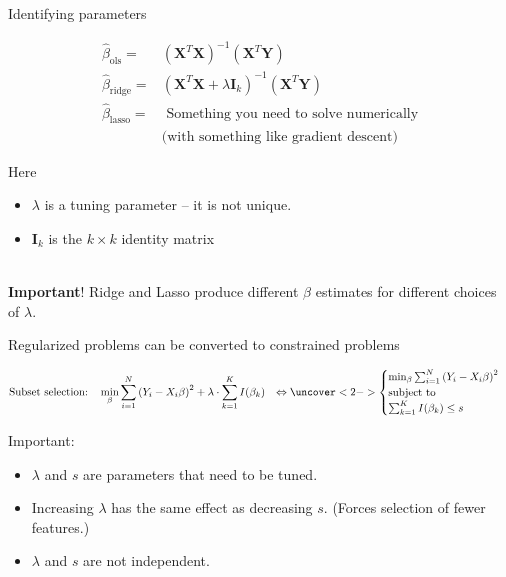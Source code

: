 \documentclass[mathserif, aspectratio=169]{beamer}
\begin{document}
\begin{frame}{Identifying parameters}

\begin{align*}
\hat{\beta}_\text{ols} = & \left(\mathbf{X}^T\mathbf{X}\right)^{-1} \left(\mathbf{X}^T\mathbf{Y}\right)\\
\hat{\beta}_\text{ridge} =& \left(\mathbf{X}^T\mathbf{X} + \lambda\mathbf{I}_k\right)^{-1} \left(\mathbf{X}^T\mathbf{Y}\right)\\
\hat{\beta}_\text{lasso}  =& \text{ Something you need to solve numerically} \\
&\text{(with something like gradient descent)}
\end{align*}

Here 
\begin{itemize}
\item $\lambda$ is a tuning parameter -- it is not unique.  
\item $\mathbf{I}_k$ is the $k\times k$ identity matrix\\~\\
\end{itemize}

\textbf{Important}! Ridge and Lasso produce different $\beta$ estimates for different choices of $\lambda$.

\end{frame}

\begin{frame}{Regularized problems can be converted to constrained problems}

\begin{align*}
\text{Subset selection:} \quad &\min_\beta \sum_{i=1}^N \left(Y_i - X_i \beta \right)^2+\lambda \cdot \sum_{k=1}^K I(\beta_k)
&\Leftrightarrow
\uncover<2->{\begin{cases}
\min_\beta \sum_{i=1}^N \left(Y_i - X_i \beta \right)^2\\
\text{subject to}\\
\sum_{k=1}^K I(\beta_k) \le s
\end{cases}}
\end{align*}

\pause
Important: 
\begin{itemize}
\item $\lambda$ and $s$ are parameters that need to be tuned. 
\item Increasing $\lambda$ has the same effect as decreasing $s$.  (Forces selection of fewer features.)
\item $\lambda$ and $s$ are not independent.  
\end{itemize}

\end{frame}
\end{document}
